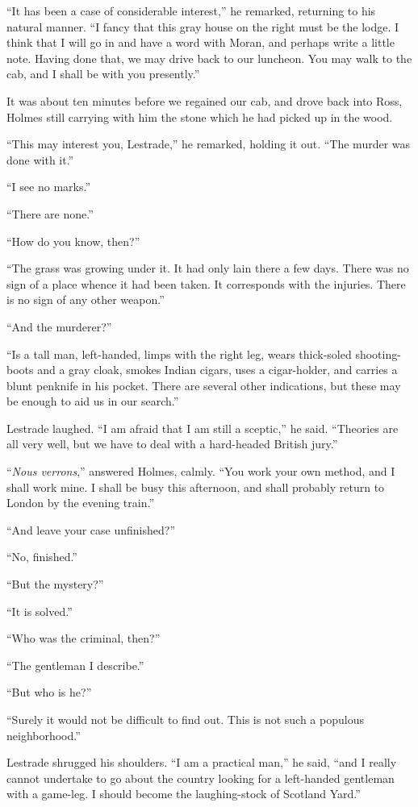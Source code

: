 “It has been a case of considerable interest,” he remarked,
returning to his natural manner. “I fancy that this gray
house on the right must be the lodge. I think that I will go
in and have a word with Moran, and perhaps write a little
note. Having done that, we may drive back to our luncheon.
You may walk to the cab, and I shall be with you presently.”

It was about ten minutes before we regained our cab, and
drove back into Ross, Holmes still carrying with him the
stone which he had picked up in the wood.

“This may interest you, Lestrade,” he remarked, holding it
out. “The murder was done with it.”

“I see no marks.”

“There are none.”

“How do you know, then?”

“The grass was growing under it. It had only lain there a
few days. There was no sign of a place whence it had been
taken. It corresponds with the injuries. There is no sign of
any other weapon.”

“And the murderer?”

“Is a tall man, left-handed, limps with the right leg, wears
thick-soled shooting-boots and a gray cloak, smokes Indian
cigars, uses a cigar-holder, and carries a blunt penknife in his
pocket. There are several other indications, but these may
be enough to aid us in our search.”

Lestrade laughed. “I am afraid that I am still a sceptic,”
he said. “Theories are all very well, but we have to deal
with a hard-headed British jury.”

“\textit{Nous verrons},” answered Holmes, calmly. “You work
your own method, and I shall work mine. I shall be busy
this afternoon, and shall probably return to London by the
evening train.”

“And leave your case unfinished?”

“No, finished.”

“But the mystery?”

“It is solved.”

“Who was the criminal, then?”

“The gentleman I describe.”

“But who is he?”

“Surely it would not be difficult to find out. This is not
such a populous neighborhood.”

Lestrade shrugged his shoulders. “I am a practical man,”
he said, “and I really cannot undertake to go about the country
looking for a left-handed gentleman with a game-leg. I
should become the laughing-stock of Scotland Yard.”

